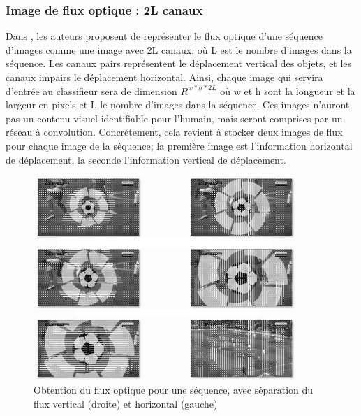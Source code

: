 \documentclass[11pt]{article}
\begin{document}
\subsubsection{Image de flux optique : 2L canaux}
\label{sec:orga230242}
Dans \cite{DBLP:journals/corr/SimonyanZ14}, les auteurs proposent de représenter le flux optique d'une séquence d'images comme une image avec 2L canaux, où L est le nombre d'images dans la séquence. Les canaux pairs représentent le déplacement vertical des objets, et les canaux impairs le déplacement horizontal. Ainsi, chaque image qui servira d'entrée au classifieur sera de dimension \(R^{w*h*2L}\) où w et h sont la longueur et la largeur en pixels et L le nombre d'images dans la séquence. Ces images n'auront pas un contenu visuel identifiable pour l'humain, mais seront comprises par un réseau à convolution. Concrètement, cela revient à stocker deux images de flux pour chaque image de la séquence; la première image est l'information horizontal de déplacement, la seconde l'information vertical de déplacement.\\
\begin{figure}[htbp]
\centering
\includegraphics[width=10cm]{optical_flow_two_stream.png}
\caption{Obtention du flux optique pour une séquence, avec séparation du flux vertical (droite) et horizontal (gauche) \label{flux-trajectory}}
\end{figure}
\end{document}
